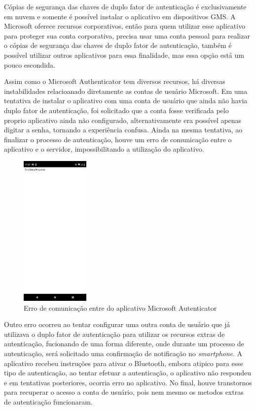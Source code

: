 \documentclass[12pt]{article}
\begin{document}
Cópias de segurança das chaves de duplo fator de autenticação é exclusivamente em
nuvem e somente é possível instalar o aplicativo em dispositivos GMS.
A Microsoft oferece recursos corporativos, então para quem utilizar esse
aplicativo para proteger sua conta corporativa, precisa usar uma conta pessoal
para realizar o cópias de segurança das chaves de duplo fator de autenticação, também
é possível utilizar outros aplicativos para essa finalidade, mas essa opção está um
pouco escondida.

Assim como o Microsoft Authenticator tem diversos recursos, há diversas instabilidades
relacioanado diretamente as contas de usuário Microsoft.
Em uma tentativa de instalar o aplicativo com uma conta de usuário que ainda não havia
duplo fator de autenticação, foi solicitado que a conta fosse verificada pelo proprio
aplicativo ainda não configurado, alternativamente era possível apenas digitar a senha,
tornando a experiência confusa.
Ainda na mesma tentativa, ao finalizar o processo de autenticação, houve um erro de
comunicação entre o aplicativo e o servidor, impossibilitando a utilização do aplicativo.

\begin{figure}[h!]
  \centering
  \includegraphics[width=0.3\textwidth]{./assets/microsoft_error_1.jpg}
  \caption{Erro de comunicação entre do aplicativo Microsoft Autenticator}
  \label{fig:MicrosoftAutenticatorErrorToManyReequests}
\end{figure}

Outro erro ocorreu ao tentar configurar uma outra conta de usuário que já utilizava o
duplo fator de autenticação para utilizar os recursos extras de autenticação, fucionando
de uma forma diferente, onde durante um processo de autenticação, será solicitado uma
confirmação de notificação no \textit{smartphone}.
A aplicativo recebeu instruções para ativar o Bluetooth, embora atipico para esse tipo
de autenticação, ao tentar efetuar a autenticação, o aplicativo não respondeu e em tentativas
posteriores, ocorria erro no aplicativo.
No final, houve transtornos para recuperar o acesso a conta de usuário, pois nem mesmo os
metodos extras de autenticação funcionaram.
\end{document}
